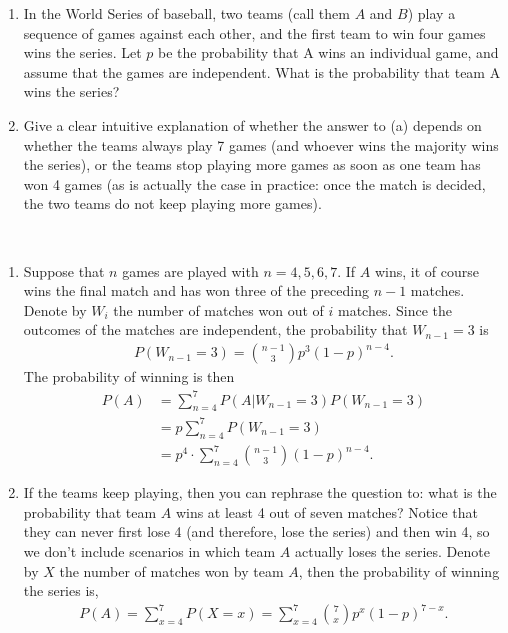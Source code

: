 
\setcounter{theorem}{9}
\begin{exercise}[BH.18]
	\begin{enumerate}
		\item In the World Series of baseball, two teams (call them $A$ and $B$) play a sequence of games against each other, and the first team to win four games wins the series. Let $p$ be the probability that A wins an individual game, and assume that the games are independent. What is the probability that team A wins the series?
		\item Give a clear intuitive explanation of whether the answer to (a) depends on whether the teams always play 7 games (and whoever wins the majority wins the series), or the teams stop playing more games as soon as one team has won 4 games (as is actually the case in practice: once the match is decided, the two teams do not keep playing more games).
	\end{enumerate}
\begin{solution}~
	\begin{enumerate}
	    \item Suppose that $n$ games are played with $n = 4,5,6,7$. If $A$ wins, it of course wins the final match and has won three of the preceding $n-1$ matches. Denote by $W_{i}$ the number of matches won out of $i$ matches. Since the outcomes of the matches are independent, the probability that $W_{n-1}=3$ is
        \begin{align*}
        	P(W_{n-1}=3) = {n-1 \choose 3}p^{3}(1-p)^{n-4}.
        \end{align*}
        The probability of winning is then
        \begin{align*}
        	P(A)& =\sum_{n=4}^{7}P(A|W_{n-1}=3)P(W_{n-1}=3)\\
        	&=p\sum_{n=4}^{7}P(W_{n-1}=3)\\
        	&=p^4\cdot \sum_{n=4}^{7}{n-1 \choose 3}(1-p)^{n-4}.
        \end{align*}
        \item If the teams keep playing, then you can rephrase the question to: what is the probability that team $A$ wins at least 4 out of seven matches? Notice that they can never first lose 4 (and therefore, lose the series) and then win 4, so we don't include scenarios in which team $A$ actually loses the series. Denote by $X$ the number of matches won by team $A$, then the probability of winning the series is,
        \begin{align*}
        	P(A) = \sum_{x=4}^{7}P(X=x) = \sum_{x=4}^{7}{7 \choose x}p^{x}(1-p)^{7-x}.
        \end{align*}
	\end{enumerate}
\end{solution}
\end{exercise}


